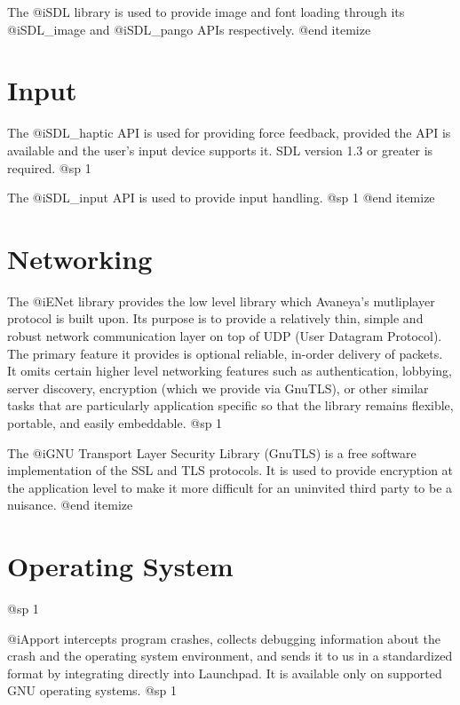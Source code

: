 \item
The @i{SDL} library is used to provide image and font loading through its @i{SDL_image} and @i{SDL_pango} APIs respectively.
@end itemize

\section{Input}

\itemize
\item
The @i{SDL_haptic} API is used for providing force feedback, provided the API is available and the user's input device supports it. SDL version 1.3 or greater is required.
@sp 1

\item
The @i{SDL_input} API is used to provide input handling.
@sp 1
@end itemize

\section{Networking}

\itemize
\item
The @i{ENet} library provides the low level library which Avaneya's mutliplayer protocol is built upon. Its purpose is to provide a relatively thin, simple and robust network communication layer on top of UDP (User Datagram Protocol). The primary feature it provides is optional reliable, in-order delivery of packets. It omits certain higher level networking features such as authentication, lobbying, server discovery, encryption (which we provide via GnuTLS), or other similar tasks that are particularly application specific so that the library remains flexible, portable, and easily embeddable.
@sp 1

\item
The @i{GNU Transport Layer Security Library} (GnuTLS) is a free software implementation of the SSL and TLS protocols. It is used to provide encryption at the application level to make it more difficult for an uninvited third party to be a nuisance.
@end itemize

\section{Operating System}
@sp 1

\itemize
\item
@i{Apport} intercepts program crashes, collects debugging information about the crash and the operating system environment, and sends it to us in a standardized format by integrating directly into Launchpad. It is available only on supported GNU operating systems.
@sp 1

